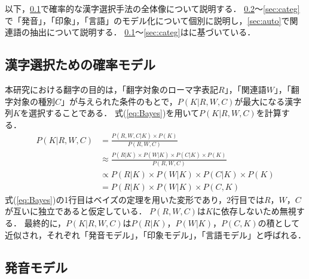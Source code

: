 \documentclass[japanese]{jnlp_1.4}
\begin{document}
{以下，\ref{sec:prob}で確率的な漢字選択手法の全体像について説明する．
\ref{sec:pronu}〜\ref{sec:categ}で「発音」，「印象」，「言語」のモデル化について個別に説明し，\ref{sec:auto}で関連語の抽出について説明する．
\ref{sec:prob}〜\ref{sec:categ}は\cite{Article_21}に基づいている．


\subsection{漢字選択ための確率モデル}\label{sec:prob}

本研究における翻字の目的は，「翻字対象のローマ字表記$R$」，「関連語$W$」，「翻字対象の種別$C$」が与えられた条件のもとで，$P(K|R,W,C)$が最大になる漢字列$K$を選択することである．
式(\ref{eq:Bayes})を用いて$P(K|R,W,C)$を計算する．
\pagebreak
\begin{equation}
 \begin{split}
  P(K|R,W,C)&=\frac{P(R,W,C|K)\times P(K)}{P(R,W,C)} \\
            &\approx \frac{P(R|K)\times P(W|K)\times P(C|K)\times P(K)}{P(R,W,C)}\\
            &\propto P(R|K)\times P(W|K)\times P(C|K)\times P(K)\\
            &= P(R|K)\times P(W|K)\times P(C,K)\label{eq:Bayes}
 \end{split}
\end{equation}
式(\ref{eq:Bayes})の1行目はベイズの定理を用いた変形であり，2行目では$R$，$W$，$C$が互いに独立であると仮定している．
$P(R,W,C)$は$K$に依存しないため無視する．
最終的に，$P(K|R,W,C)$は$P(R|K)$，$P(W|K)$，$P(C,K)$の積として近似され，それぞれ「発音モデル」，「印象モデル」，「言語モデル」と呼ばれる．


\subsection{発音モデル}\label{sec:pronu}

}
\end{document}
